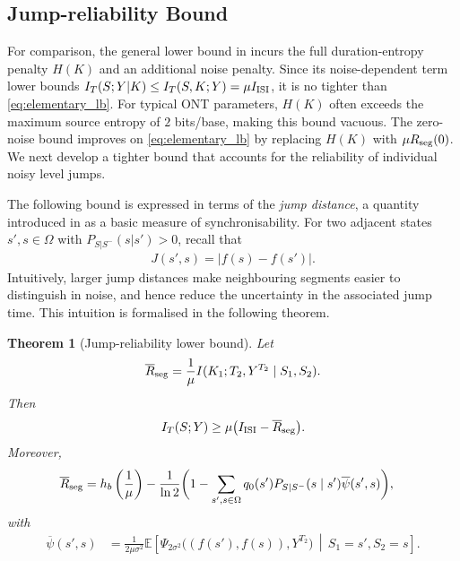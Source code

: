 \documentclass[onecolumn]{IEEEtran}
\newtheorem{theorem}{Theorem}
\theoremstyle{definition}
\begin{document}
\subsection{Jump-reliability Bound}

{
For comparison, the general lower bound in \cite{Rameshwar2025} incurs the
full duration-entropy penalty $H(K)$ and an additional noise penalty. Since
its noise-dependent term lower bounds $I_T(S;Y|K)\le I_T(S,K;Y)=\mu
I_{\rm ISI}$, it is no tighter than \eqref{eq:elementary_lb}. For typical ONT
parameters, $H(K)$ often exceeds the maximum source entropy of $2$ bits/base,
making this bound vacuous. The zero-noise bound improves on
\eqref{eq:elementary_lb} by replacing $H(K)$ with $\mu R_{\rm seg}(0)$. We
next develop a tighter bound that accounts for the reliability of individual
noisy level jumps.
}

The following bound is expressed in terms of the \emph{jump distance}, a quantity introduced in \cite{McBain2022,McBain2024a} as a basic measure of synchronisability. For two adjacent states $s',s\in\Omega$ with $P_{S|S^{-}}(s|s')>0$, {recall that}
\begin{align}
    J(s',s) = \bigl| f(s) - f(s') \bigr|.
\end{align}
Intuitively, larger jump distances make neighbouring segments easier to distinguish in noise, and hence reduce the uncertainty in the associated jump time. This intuition is formalised in the following theorem.


\begin{theorem}[Jump-reliability lower bound]
\label{thm:jump_reliability_lower_bound}
Let 
\begin{align}
    \overline{R}_{\rm seg}
    =
    \frac{1}{\mu}
    I(K_1;{T_2},Y^{T_2}\mid S_1,S_2).
\end{align}
Then
\begin{align}\label{eq:LB_eq}
    I_T(S;Y)\ge \mu\bigl(I_{\rm ISI}-\overline{R}_{\rm seg}\bigr).
\end{align}
Moreover,
{\begin{align}
    \overline{R}_{\rm seg}
    &=h_b\left(\frac{1}{\mu}\right)- \frac{1}{\ln 2}
    \biggl( 1-\sum_{s',s\in\Omega} q_0(s')P_{S|S^-}(s\mid s')
    \overline{\psi}(s',s)
    \biggr),
\end{align}}
with
{\begin{align}
    \overline{\psi}(s',s)
    &=
    \frac{1}{2\mu\sigma^2}
    \mathbb{E}\!\left[
        \Psi_{2\sigma^2}\bigl((f(s'),f(s)),Y^{T_2}\bigr)
        \,\middle|\,
        S_1=s',S_2=s
    \right].
\end{align}}
\end{theorem}
\end{document}
